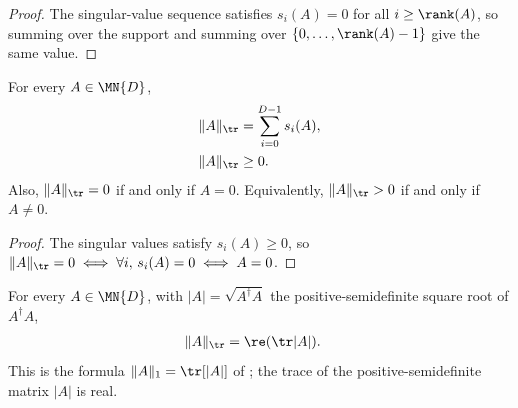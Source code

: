 \begin{proof}\leanok
    The singular-value sequence satisfies $s_i(A)=0$ for all
    $i\geq\rank(A)$, so summing over the support and summing
    over $\{0,\ldots,\rank(A)-1\}$ give the same value.
\end{proof}

\begin{theorem}
    \label{thm:trace_norm_elementary}
    \leanok
    For every $A\in\MN{D}$,
    \begin{align}
        \lVert A\rVert_{\tr}
         & =\sum_{i=0}^{D-1}s_i(A),
        \label{eq:entropy_trace_norm_fin} \\
        \lVert A\rVert_{\tr}
         & \geq 0.
        \notag
    \end{align}
    Also, $\lVert A\rVert_{\tr}=0$ if and only if $A=0$.
    Equivalently, $\lVert A\rVert_{\tr}>0$ if and only if $A\neq0$.
\end{theorem}

\begin{proof}\leanok
    The singular values satisfy $s_i(A)\geq0$, so
    $\lVert A\rVert_{\tr}=0
        \iff \forall i,\,s_i(A)=0
        \iff A=0$.
\end{proof}

\begin{theorem}
    \label{thm:trace_norm_abs}
    \leanok
    For every $A\in\MN{D}$, with
    $\lvert A\rvert=\sqrt{A^\dagger A}$ the positive-semidefinite square root
    of $A^\dagger A$,
    \begin{align}
        \lVert A\rVert_{\tr}
         & =\re(\tr\lvert A\rvert).
        \label{eq:entropy_trace_norm_abs}
    \end{align}
    This is the formula $\lVert A\rVert_1=\tr[\lvert A\rvert]$
    of \cite[Chapter~8, Section~8.1]{Wolf2012Quantum}; the trace of the
    positive-semidefinite matrix $\lvert A\rvert$ is real.
\end{theorem}

